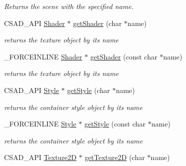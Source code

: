 \begin{DoxyCompactItemize}
\begin{DoxyCompactList}\small\item\em Returns the scene with the specified name. \end{DoxyCompactList}\item 
\hypertarget{classcsad_1_1_graph_ab59e8d239ebfb02c3324f4444c524b21}{C\-S\-A\-D\-\_\-\-A\-P\-I \hyperlink{classcsad_1_1_shader}{Shader} $\ast$ \hyperlink{classcsad_1_1_graph_ab59e8d239ebfb02c3324f4444c524b21}{get\-Shader} (char $\ast$name)}\label{classcsad_1_1_graph_ab59e8d239ebfb02c3324f4444c524b21}

\begin{DoxyCompactList}\small\item\em returns the texture object by its name \end{DoxyCompactList}\item 
\hypertarget{classcsad_1_1_graph_acc31c77a666e7d69e67ae87ba4096d5f}{\-\_\-\-F\-O\-R\-C\-E\-I\-N\-L\-I\-N\-E \hyperlink{classcsad_1_1_shader}{Shader} $\ast$ \hyperlink{classcsad_1_1_graph_acc31c77a666e7d69e67ae87ba4096d5f}{get\-Shader} (const char $\ast$name)}\label{classcsad_1_1_graph_acc31c77a666e7d69e67ae87ba4096d5f}

\begin{DoxyCompactList}\small\item\em returns the texture object by its name \end{DoxyCompactList}\item 
\hypertarget{classcsad_1_1_graph_ab692b69f2cc4bf190371f43fd22fe711}{C\-S\-A\-D\-\_\-\-A\-P\-I \hyperlink{classcsad_1_1_style}{Style} $\ast$ \hyperlink{classcsad_1_1_graph_ab692b69f2cc4bf190371f43fd22fe711}{get\-Style} (char $\ast$name)}\label{classcsad_1_1_graph_ab692b69f2cc4bf190371f43fd22fe711}

\begin{DoxyCompactList}\small\item\em returns the container style object by its name \end{DoxyCompactList}\item 
\hypertarget{classcsad_1_1_graph_a4bbdc58c479f9e69d77da5d796b9c021}{\-\_\-\-F\-O\-R\-C\-E\-I\-N\-L\-I\-N\-E \hyperlink{classcsad_1_1_style}{Style} $\ast$ \hyperlink{classcsad_1_1_graph_a4bbdc58c479f9e69d77da5d796b9c021}{get\-Style} (const char $\ast$name)}\label{classcsad_1_1_graph_a4bbdc58c479f9e69d77da5d796b9c021}

\begin{DoxyCompactList}\small\item\em returns the container style object by its name \end{DoxyCompactList}\item 
\hypertarget{classcsad_1_1_graph_a329447b6cb22fda4b6c2b3cea3fcaeb5}{C\-S\-A\-D\-\_\-\-A\-P\-I \hyperlink{classcsad_1_1_texture2_d}{Texture2\-D} $\ast$ \hyperlink{classcsad_1_1_graph_a329447b6cb22fda4b6c2b3cea3fcaeb5}{get\-Texture2\-D} (char $\ast$name)}\label{classcsad_1_1_graph_a329447b6cb22fda4b6c2b3cea3fcaeb5}


\end{DoxyCompactItemize}
